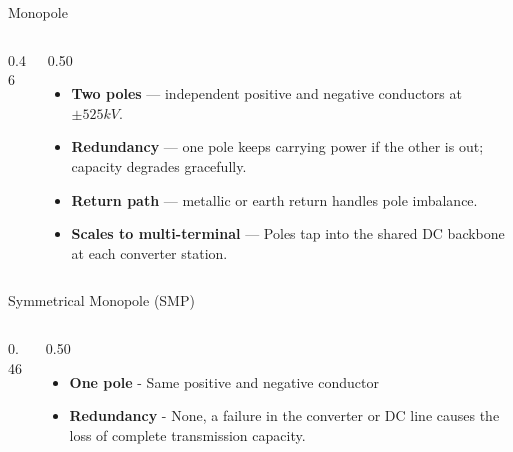 

\begin{frame}{Monopole}
  \begin{columns}[c,onlytextwidth]
    \begin{column}{0.46\textwidth}
      \centering
    \end{column}
    \begin{column}{0.50\textwidth}
      \vspace{0.5em}
      \begin{itemize}
        \setlength{\itemsep}{0.7em}
        \item \textbf{Two poles} --- independent positive and negative
              conductors at $\pm525kV$.
        \item \textbf{Redundancy} --- one pole keeps carrying power if the
              other is out; capacity degrades gracefully.
        \item \textbf{Return path} --- metallic or earth return handles
              pole imbalance.
        \item \textbf{Scales to multi-terminal} --- Poles tap into the shared DC backbone at each converter station.
      \end{itemize}
    \end{column}
  \end{columns}
\end{frame}

\begin{frame}{Symmetrical Monopole (SMP)}
  \begin{columns}[c,onlytextwidth]
    \begin{column}{0.46\textwidth}
      \centering
    \end{column}
    \begin{column}{0.50\textwidth}
      \begin{itemize}
        \setlength{\itemsep}{0.7em}
        \item \textbf{One pole} - Same positive and negative conductor
        \item \textbf{Redundancy} - None, a failure in the converter or DC line causes the loss of complete transmission capacity.

      \end{itemize}
    \end{column}
  \end{columns}
\end{frame}


